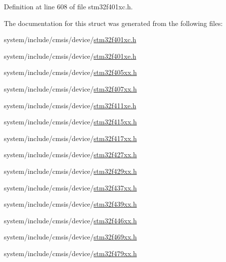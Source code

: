 Definition at line 608 of file stm32f401xc.\+h.



The documentation for this struct was generated from the following files\+:\begin{DoxyCompactItemize}
\item 
system/include/cmsis/device/\hyperlink{stm32f401xc_8h}{stm32f401xc.\+h}\item 
system/include/cmsis/device/\hyperlink{stm32f401xe_8h}{stm32f401xe.\+h}\item 
system/include/cmsis/device/\hyperlink{stm32f405xx_8h}{stm32f405xx.\+h}\item 
system/include/cmsis/device/\hyperlink{stm32f407xx_8h}{stm32f407xx.\+h}\item 
system/include/cmsis/device/\hyperlink{stm32f411xe_8h}{stm32f411xe.\+h}\item 
system/include/cmsis/device/\hyperlink{stm32f415xx_8h}{stm32f415xx.\+h}\item 
system/include/cmsis/device/\hyperlink{stm32f417xx_8h}{stm32f417xx.\+h}\item 
system/include/cmsis/device/\hyperlink{stm32f427xx_8h}{stm32f427xx.\+h}\item 
system/include/cmsis/device/\hyperlink{stm32f429xx_8h}{stm32f429xx.\+h}\item 
system/include/cmsis/device/\hyperlink{stm32f437xx_8h}{stm32f437xx.\+h}\item 
system/include/cmsis/device/\hyperlink{stm32f439xx_8h}{stm32f439xx.\+h}\item 
system/include/cmsis/device/\hyperlink{stm32f446xx_8h}{stm32f446xx.\+h}\item 
system/include/cmsis/device/\hyperlink{stm32f469xx_8h}{stm32f469xx.\+h}\item 
system/include/cmsis/device/\hyperlink{stm32f479xx_8h}{stm32f479xx.\+h}\end{DoxyCompactItemize}
